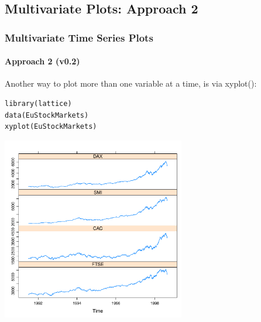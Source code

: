 \subsection{Multivariate Plots: Approach 2}
\begin{frame}
 \frametitle{Multivariate Time Series Plots}
 \framesubtitle{Approach 2 (v0.2)}

Another way to plot more than one variable at a time, is via \ttfamily xyplot()\normalfont :

    \begin{lstlisting}
library(lattice) 
data(EuStockMarkets)
xyplot(EuStockMarkets)
   \end{lstlisting}


       \begin{center}
         \includegraphics[width=0.6\textwidth]{images/stockPlot0.pdf}
        \end{center}
\end{frame}

